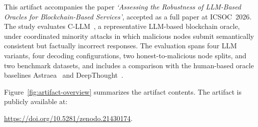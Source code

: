 This artifact accompanies the paper \emph{`Assessing the Robustness of LLM-Based Oracles for Blockchain-Based Services'}, accepted as a full paper at ICSOC~2026. The study evaluates C-LLM~\cite{xian2024cllm}, a representative LLM-based blockchain oracle, under coordinated minority attacks in which malicious nodes submit semantically consistent but factually incorrect responses. The evaluation spans four LLM variants, four decoding configurations, two honest-to-malicious node splits, and two benchmark datasets, and includes a comparison with the human-based oracle baselines Astraea~\cite{adler2018astraea} and DeepThought~\cite{di2022deepthought}.

Figure~\ref{fig:artifact-overview} summarizes the artifact contents. The artifact is publicly available at:
\begin{center}
\url{https://doi.org/10.5281/zenodo.21430174}.
\end{center}



